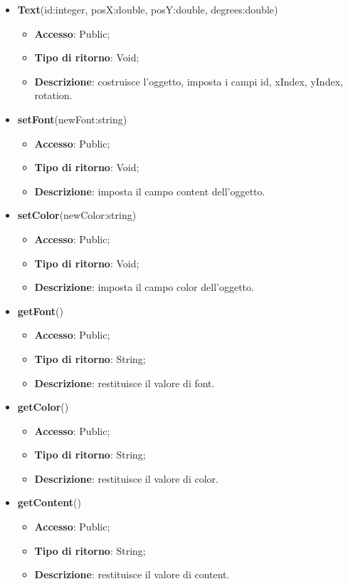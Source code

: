 {{			
			\begin{itemize}
				\item \textbf{Text}(id:integer, posX:double, posY:double, degrees:double)
				\begin{itemize}
					\item \textbf{Accesso}: Public;
					\item \textbf{Tipo di ritorno}: Void;
					\item \textbf{Descrizione}: costruisce l’oggetto, imposta i campi id, xIndex, yIndex, rotation.
				\end{itemize}
				\item \textbf{setFont}(newFont:string)
				\begin{itemize}
					\item \textbf{Accesso}: Public;
					\item \textbf{Tipo di ritorno}: Void;
					\item \textbf{Descrizione}: imposta il campo content dell’oggetto.
				\end{itemize}
				\item \textbf{setColor}(newColor:string)
				\begin{itemize}
					\item \textbf{Accesso}: Public;
					\item \textbf{Tipo di ritorno}: Void;
					\item \textbf{Descrizione}: imposta il campo color dell’oggetto.
				\end{itemize}
				\item \textbf{getFont}()
				\begin{itemize}
					\item \textbf{Accesso}: Public;
					\item \textbf{Tipo di ritorno}: String;
					\item \textbf{Descrizione}: restituisce il valore di font.
				\end{itemize}
				\item \textbf{getColor}()
				\begin{itemize}
					\item \textbf{Accesso}: Public;
					\item \textbf{Tipo di ritorno}: String;
					\item \textbf{Descrizione}: restituisce il valore di color.
				\end{itemize}
				\item \textbf{getContent}()
				\begin{itemize}
					\item \textbf{Accesso}: Public;
					\item \textbf{Tipo di ritorno}: String;
					\item \textbf{Descrizione}: restituisce il valore di content.
				\end{itemize}
			\end{itemize}
		}
}
